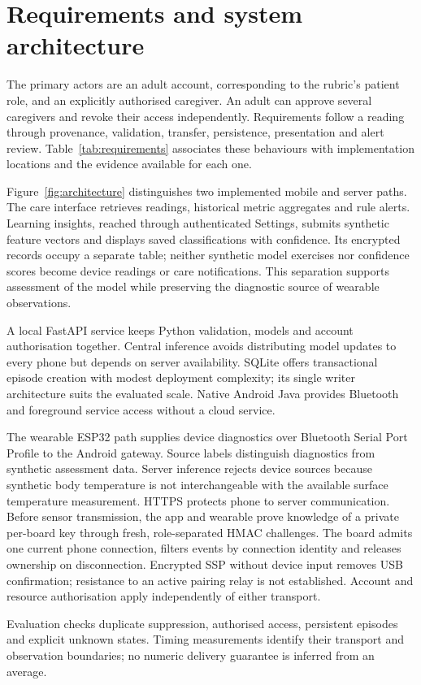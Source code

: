 \section{Requirements and system architecture}
\label{sec:architecture}
\begin{reportprose}
The primary actors are an adult account, corresponding to the rubric's patient role, and an explicitly authorised caregiver. An adult can approve several caregivers and revoke their access independently. Requirements follow a reading through provenance, validation, transfer, persistence, presentation and alert review. Table~\ref{tab:requirements} associates these behaviours with implementation locations and the evidence available for each one.

Figure~\ref{fig:architecture} distinguishes two implemented mobile and server paths. The care interface retrieves readings, historical metric aggregates and rule alerts. Learning insights, reached through authenticated Settings, submits synthetic feature vectors and displays saved classifications with confidence. Its encrypted records occupy a separate table; neither synthetic model exercises nor confidence scores become device readings or care notifications. This separation supports assessment of the model while preserving the diagnostic source of wearable observations.

A local FastAPI service keeps Python validation, models and account authorisation together. Central inference avoids distributing model updates to every phone but depends on server availability. SQLite offers transactional episode creation with modest deployment complexity; its single writer architecture suits the evaluated scale. Native Android Java provides Bluetooth and foreground service access without a cloud service.

The wearable ESP32 path supplies device diagnostics over Bluetooth Serial Port Profile to the Android gateway. Source labels distinguish diagnostics from synthetic assessment data. Server inference rejects device sources because synthetic body temperature is not interchangeable with the available surface temperature measurement. HTTPS protects phone to server communication. Before sensor transmission, the app and wearable prove knowledge of a private per-board key through fresh, role-separated HMAC challenges. The board admits one current phone connection, filters events by connection identity and releases ownership on disconnection. Encrypted SSP without device input removes USB confirmation; resistance to an active pairing relay is not established. Account and resource authorisation apply independently of either transport.

Evaluation checks duplicate suppression, authorised access, persistent episodes and explicit unknown states. Timing measurements identify their transport and observation boundaries; no numeric delivery guarantee is inferred from an average.
\end{reportprose}
\RequirementsTable
\ArchitectureDiagram
\FloatBarrier

